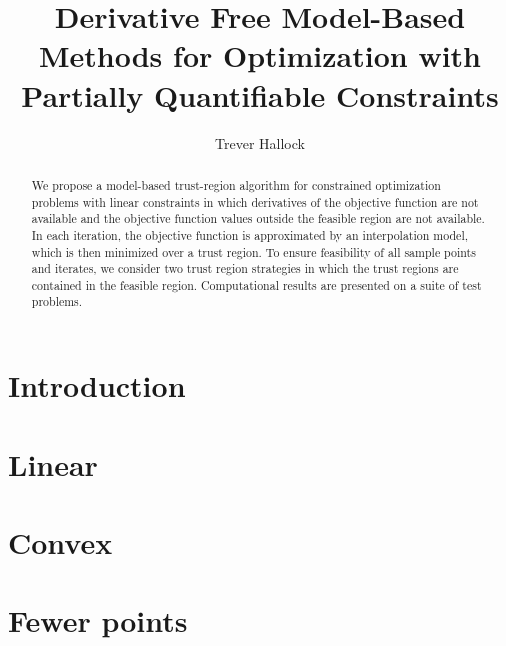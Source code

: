 \documentclass{report}
\title{Derivative Free Model-Based Methods for Optimization with Partially Quantifiable Constraints}
\author{Trever Hallock}
\begin{document}
\maketitle

\begin{abstract}

We propose a model-based trust-region algorithm for constrained optimization problems with linear constraints in which derivatives of the objective function are not available and the objective function values outside the feasible region are not available.
In each iteration, the objective function is approximated by an interpolation model, which is then minimized over a trust region.
To ensure feasibility of all sample points and iterates, we consider two trust region strategies in which the trust regions are contained in the feasible region.
Computational results are presented on a suite of test problems.

\end{abstract}

\newpage

\tableofcontents

\newpage

\chapter{Introduction}



\chapter{Linear}






\chapter{Convex}







\chapter{Fewer points}






\appendix





\end{document}
